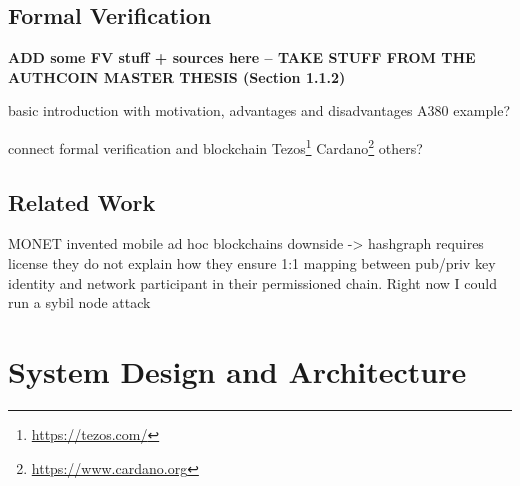 \documentclass{llncs}
\begin{document}
{		%
		
		\subsection{Formal Verification}
			\label{ss:formal-verification}

			\textbf{ADD some FV stuff + sources here -- TAKE STUFF FROM THE AUTHCOIN MASTER THESIS \cite{leiding2017securing} (Section 1.1.2)}			
			
			basic introduction with motivation, advantages and disadvantages
			A380 example?
			
			
			connect formal verification and blockchain
			Tezos\footnote{\url{https://tezos.com/}} \cite{tezosWhitepaper}
			Cardano\footnote{\url{https://www.cardano.org}} \cite{bibid}
			others?
		
		\subsection{Related Work}
			\label{ss:related-work}

			MONET \cite{monetWhitepaper} invented mobile ad hoc blockchains
			downside -> hashgraph requires license
			they do not explain how they ensure 1:1 mapping between pub/priv key identity and network participant in their permissioned chain. Right now I could run a sybil node attack
			
		


	\section{System Design and Architecture}
		\label{s:section-3}
		
		
}
\end{document}
